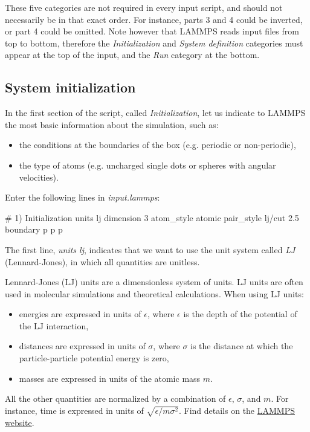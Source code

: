 \noindent These five categories are not required in every
input script, and should not necessarily be in that
exact order. For instance, parts 3 and 4 could be inverted, or
part 4 could be omitted. Note however that LAMMPS reads input
files from top to bottom, therefore the \textit{Initialization} and 
\textit{System definition} categories must appear at the top of the
input, and the \textit{Run} category at the bottom.

\subsection{System initialization}
\noindent In the first section of the script, called \textit{Initialization},
let us indicate to LAMMPS the most basic information
about the simulation, such as:

\begin{itemize}
\item the conditions at the boundaries of the box (e.g. periodic or non-periodic),
\item the type of atoms (e.g. uncharged single dots or spheres with angular velocities).
\end{itemize}

\vspace{0.25cm} \noindent Enter the following lines in \textit{input.lammps}:

\begin{lcverbatim}
# 1) Initialization
units lj
dimension 3
atom_style atomic
pair_style lj/cut 2.5
boundary p p p
\end{lcverbatim}

\noindent The first line, \textit{units lj}, indicates that we want to
use the unit system called \textit{LJ} (Lennard-Jones), in
which all quantities are unitless. 

\begin{tcolorbox}[colback=mylightblue!5!white,colframe=mylightblue!75!black,title=About Lennard-Jones (LJ) units]

\vspace{0.25cm} \noindent Lennard-Jones (LJ) units are a dimensionless system of units.
LJ units are often used in molecular simulations
and theoretical calculations. When using LJ units:

\begin{itemize}
\item energies are expressed in units of $\epsilon$, where $\epsilon$ is the
  depth of the potential of the LJ interaction,
\item distances are expressed in units of $\sigma$, where $\sigma$ is the distance
  at which the particle-particle potential energy is zero,
\item masses are expressed in units of the atomic mass $m$.
\end{itemize}

\vspace{0.25cm} \noindent All the other quantities are normalized by a combination of $\epsilon$, $\sigma$,
and $m$. For instance, time is expressed in units of $\sqrt{ \epsilon / m \sigma^2}$.
Find details on the \href{https://docs.lammps.org/units.html}{LAMMPS website}.
\end{tcolorbox}

